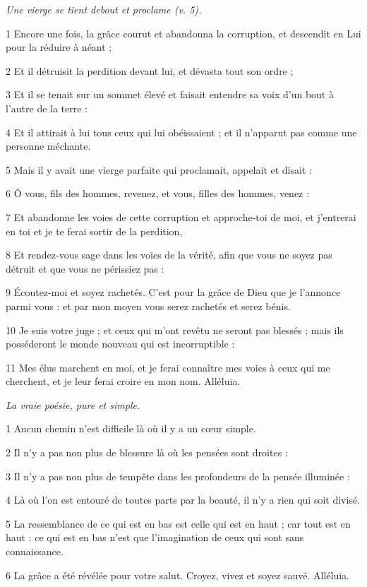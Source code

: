 
\par \textit{Une vierge se tient debout et proclame (v. 5).}

\par 1 Encore une fois, la grâce courut et abandonna la corruption, et descendit en Lui pour la réduire à néant ;
\par 2 Et il détruisit la perdition devant lui, et dévasta tout son ordre ;
\par 3 Et il se tenait sur un sommet élevé et faisait entendre sa voix d'un bout à l'autre de la terre :
\par 4 Et il attirait à lui tous ceux qui lui obéissaient ; et il n'apparut pas comme une personne méchante.
\par 5 Mais il y avait une vierge parfaite qui proclamait, appelait et disait :
\par 6 Ô vous, fils des hommes, revenez, et vous, filles des hommes, venez :
\par 7 Et abandonne les voies de cette corruption et approche-toi de moi, et j'entrerai en toi et je te ferai sortir de la perdition,
\par 8 Et rendez-vous sage dans les voies de la vérité, afin que vous ne soyez pas détruit et que vous ne périssiez pas :
\par 9 Écoutez-moi et soyez rachetés. C'est pour la grâce de Dieu que je l'annonce parmi vous : et par mon moyen vous serez rachetés et serez bénis.
\par 10 Je suis votre juge ; et ceux qui m'ont revêtu ne seront pas blessés ; mais ils posséderont le monde nouveau qui est incorruptible :
\par 11 Mes élus marchent en moi, et je ferai connaître mes voies à ceux qui me cherchent, et je leur ferai croire en mon nom. Alléluia.




\par \textit{La vraie poésie, pure et simple.}

\par 1 Aucun chemin n'est difficile là où il y a un cœur simple.
\par 2 Il n'y a pas non plus de blessure là où les pensées sont droites :
\par 3 Il n'y a pas non plus de tempête dans les profondeurs de la pensée illuminée :
\par 4 Là où l'on est entouré de toutes parts par la beauté, il n'y a rien qui soit divisé.
\par 5 La ressemblance de ce qui est en bas est celle qui est en haut ; car tout est en haut : ce qui est en bas n'est que l'imagination de ceux qui sont sans connaissance.
\par 6 La grâce a été révélée pour votre salut. Croyez, vivez et soyez sauvé. Alléluia.

